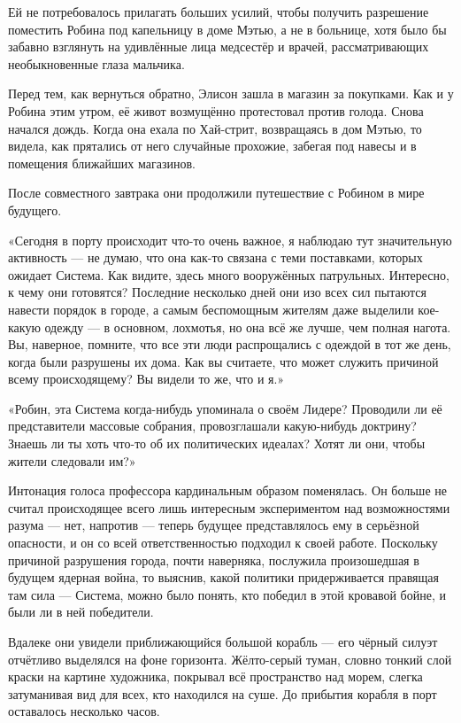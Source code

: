 \documentclass[a4paper,12pt]{book}
\begin{document}
\par
Ей не потребовалось прилагать больших усилий, чтобы получить разрешение поместить Робина под капельницу в доме Мэтью, а не в больнице, хотя было бы забавно взглянуть на удивлённые лица медсестёр и врачей, рассматривающих необыкновенные глаза мальчика.
\par
Перед тем, как вернуться обратно, Элисон зашла в магазин за покупками.  Как и у Робина этим утром, её живот возмущённо протестовал против голода. Снова начался дождь. Когда она ехала по Хай-стрит, возвращаясь в дом Мэтью, то видела, как прятались от него случайные прохожие, забегая под навесы и в помещения ближайших магазинов.
\par
После совместного завтрака они продолжили путешествие с Робином в мире будущего.
\par
«Сегодня в порту происходит что-то очень важное, я наблюдаю тут значительную активность — не думаю, что она как-то связана с теми поставками, которых ожидает Система. Как видите, здесь много вооружённых патрульных. Интересно, к чему они готовятся? Последние несколько дней они изо всех сил пытаются навести порядок в городе, а самым беспомощным жителям даже выделили кое-какую одежду — в основном, лохмотья, но она всё же лучше, чем полная нагота. Вы, наверное, помните, что все эти люди распрощались с одеждой в тот же день, когда были разрушены их дома. Как вы считаете, что может служить причиной всему происходящему? Вы видели то же, что и я.»\\
\par
«Робин, эта Система когда-нибудь упоминала о своём Лидере? Проводили ли её представители массовые собрания, провозглашали какую-нибудь доктрину? Знаешь ли ты хоть что-то об их политических идеалах? Хотят ли они, чтобы жители следовали им?»
\par
Интонация голоса профессора кардинальным образом поменялась. Он больше не считал происходящее всего лишь интересным экспериментом над возможностями разума — нет, напротив — теперь будущее представлялось ему в серьёзной опасности, и он со всей ответственностью подходил к своей работе. Поскольку причиной разрушения города, почти наверняка, послужила произошедшая в будущем ядерная война, то выяснив, какой политики придерживается правящая там сила — Система, можно было понять, кто победил в этой кровавой бойне, и были ли в ней победители.\\
\par
Вдалеке они увидели приближающийся большой корабль — его чёрный силуэт отчётливо выделялся на фоне горизонта. Жёлто-серый туман, словно тонкий слой краски на картине художника, покрывал всё пространство над морем, слегка затуманивая вид для всех, кто находился на суше. До прибытия корабля в порт оставалось несколько часов.
\end{document}
